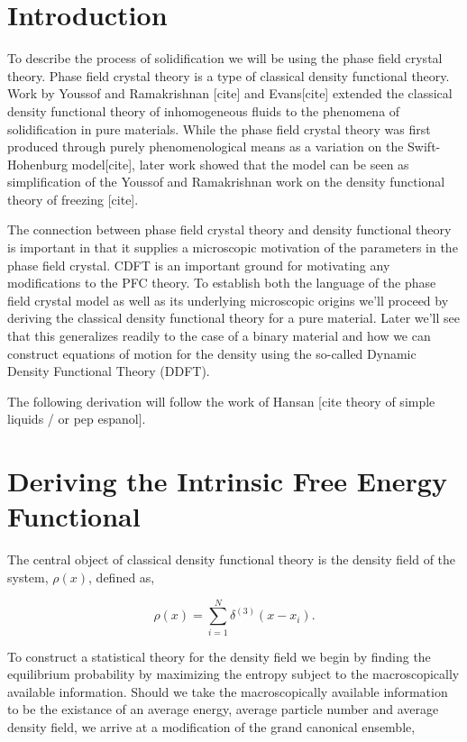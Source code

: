 \section{Introduction}
To describe the process of solidification we will be using the phase field crystal theory. Phase field crystal theory is a type of classical density functional theory. Work by Youssof and Ramakrishnan [cite] and Evans[cite] extended the classical density functional theory of inhomogeneous fluids to the phenomena of solidification in pure materials. While the phase field crystal theory was first produced through purely phenomenological means as a variation on the Swift-Hohenburg model[cite], later work showed that the model can be seen as simplification of the Youssof and Ramakrishnan work on the density functional theory of freezing [cite]. 

The connection between phase field crystal theory and density functional theory is important in that it supplies a microscopic motivation of the parameters in the phase field crystal. CDFT is an important ground for motivating any modifications to the PFC theory. To establish both the language of the phase field crystal model as well as its underlying microscopic origins we'll proceed by deriving the classical density functional theory for a pure material. Later we'll see that this generalizes readily to the case of a binary material and how we can construct equations of motion for the density using the so-called Dynamic Density Functional Theory (DDFT). 

The following derivation will follow the work of Hansan [cite theory of simple liquids / or pep espanol].

\section{Deriving the Intrinsic Free Energy Functional}

The central object of classical density functional theory is the density field of the system, $\rho(x)$, defined as, 

\begin{equation}
    \rho(x) = \sum_{i=1}^N \delta^{(3)}(x - x_i).
\end{equation}

To construct a statistical theory for the density field we begin by finding the equilibrium probability by maximizing the entropy subject to the macroscopically available information. Should we take the macroscopically available information to be the existance of an average energy, average particle number and average density field, we arrive at a modification of the grand canonical ensemble, 


